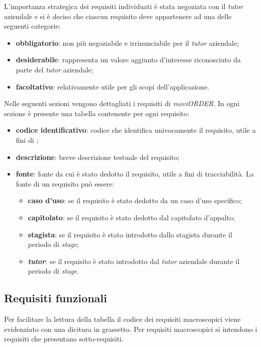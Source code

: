 L'importanza strategica dei requisiti individuati è stata negoziata con il \textit{tutor} aziendale e si è deciso che ciascun requisito deve appartenere ad una delle seguenti categorie:
\begin{itemize}
	\item \textbf{obbligatorio}: non più negoziabile e irrinunciabile per il \textit{tutor} aziendale;
	\item \textbf{desiderabile}: rappresenta un valore aggiunto d'interesse riconosciuto da parte del \textit{tutor} aziendale;
	\item \textbf{facoltativo}: relativamente utile per gli scopi dell'applicazione.
\end{itemize}

Nelle seguenti sezioni vengono dettagliati i requisiti di \textit{moviORDER}. In ogni sezione è presente una tabella contenente per ogni requisito:
\begin{itemize}
	\item \textbf{codice identificativo}: codice che identifica univocamente il requisito, utile a fini di ;
	\item \textbf{descrizione}: breve descrizione testuale del requisito;
	\item \textbf{fonte}: fonte da cui è stato dedotto il requisito, utile a fini di tracciabilità. La fonte di un requisito può essere:
		\begin{itemize}
			\item \textbf{caso d'uso}: se il requisito è stato dedotto da un caso d'uso specifico;
			\item \textbf{capitolato}: se il requisito è stato dedotto dal capitolato d'appalto;
			\item \textbf{stagista}: se il requisito è stato introdotto dallo stagista durante il periodo di \textit{stage};
			\item \textbf{\textit{tutor}}: se il requisito è stato introdotto dal \textit{tutor} aziendale durante il periodo di \textit{stage}.
		\end{itemize}
\end{itemize}

\newpage

\subsection{Requisiti funzionali}

Per facilitare la lettura della tabella il codice dei requisiti macroscopici viene evidenziato con una dicitura in grassetto. Per requisiti macroscopici si intendono i requisiti che presentano sotto-requisiti.

